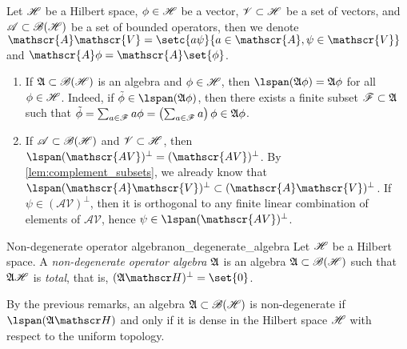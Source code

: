Let \(\mathscr{H}\) be a Hilbert space, \(\phi \in \mathscr{H}\) be a vector, \(\mathscr{V} \subset \mathscr{H}\) be a set of vectors, and \(\mathscr{A} \subset \mathscr{B}(\mathscr{H})\) be a set of bounded operators, then we denote \(\mathscr{A}\mathscr{V} = \setc{a \psi}{a \in \mathscr{A}, \psi \in \mathscr{V}}\) and \(\mathscr{A}\phi = \mathscr{A}\set{\phi}\).
\begin{enumerate}[label=(\alph*)]
    \item If \(\mathfrak{A} \subset \mathscr{B}(\mathscr{H})\) is an algebra and \(\phi \in \mathscr{H}\), then \(\lspan(\algebra{A}\phi) = \algebra{A}\phi\) for all \(\phi \in \mathscr{H}\). Indeed, if \(\tilde{\phi} \in \lspan(\algebra{A}\phi)\), then there exists a finite subset \(\mathscr{F} \subset \mathfrak{A}\) such that \(\tilde{\phi} = \sum_{a \in \mathscr{F}} a\phi = \left(\sum_{a \in \mathscr{F}} a\right)\phi \in \mathfrak{A}\phi\).
    \item If \(\mathscr{A} \subset \mathscr{B}(\mathscr{H})\) and \(\mathscr{V} \subset \mathscr{H}\), then \(\lspan(\mathscr{AV})^{\perp} = (\mathscr{AV})^{\perp}\). By \cref{lem:complement_subsets}, we already know that \(\lspan(\mathscr{A}\mathscr{V})^{\perp} \subset (\mathscr{A}\mathscr{V})^\perp\). If \(\psi \in (\mathscr{AV})^{\perp}\), then it is orthogonal to any finite linear combination of elements of \(\mathscr{AV}\), hence \(\psi \in \lspan(\mathscr{AV})^{\perp}\).
\end{enumerate}
\begin{definition}{Non-degenerate operator algebra}{non_degenerate_algebra}
    Let \(\mathscr{H}\) be a Hilbert space. A \emph{non-degenerate operator algebra \(\mathfrak{A}\)} is an algebra \(\mathfrak{A} \subset \mathscr{B}(\mathscr{H})\) such that \(\mathfrak{A}\mathscr{H}\) is \emph{total}, that is, \((\algebra{A}\hilbert)^{\perp} = \set{0}\).
\end{definition}
\begin{remark}
    By the previous remarks, an algebra \(\mathfrak{A} \subset \mathscr{B}(\mathscr{H})\) is non-degenerate if \(\lspan(\algebra{A}\hilbert)\) and only if it is dense in the Hilbert space \(\mathscr{H}\) with respect to the uniform topology.
\end{remark}

